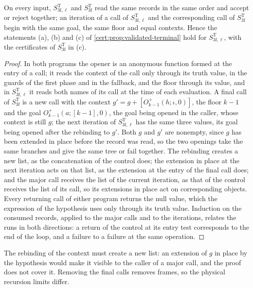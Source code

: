 \begin{proposition}\label{cert:prop:loop-continuation}
On every input, $S^{\mathrm T}_{3\mathrm f,\ell}$ and $S^{\mathrm T}_{3\mathrm f}$
read the same records in the same order and accept or reject together; an iteration
of a call of $S^{\mathrm T}_{3\mathrm f,\ell}$ and the corresponding call of
$S^{\mathrm T}_{3\mathrm f}$ begin with the same goal, the same floor and equal
contexts. Hence the statements (a), (b) and (c) of
\cref{cert:prop:validated-terminal} hold for $S^{\mathrm T}_{3\mathrm f,\ell}$, with
the certificates of $S^{\mathrm T}_{3\mathrm f}$ in (c).
\end{proposition}
\begin{proof}
In both programs the opener is an anonymous function formed at the entry of a call;
it reads the context of the call only through its truth value, in the guards of the
first phase and in the fallback, and the floor through its value, and in
$S^{\mathrm T}_{3\mathrm f,\ell}$ it reads both names of its call at the time of
each evaluation. A final call of $S^{\mathrm T}_{3\mathrm f}$ is a new call with the
context $g'=g+[O^{+}_{k-1}(h;\iota,0)]$, the floor $k-1$ and the goal
$O^{+}_{k-1}(a;[k-1],0)$, the goal being opened in the caller, whose context is still
$g$; the next iteration of $S^{\mathrm T}_{3\mathrm f,\ell}$ has the same three
values, its goal being opened after the rebinding to $g'$. Both $g$ and $g'$ are
nonempty, since $g$ has been extended in place before the record was read, so the
two openings take the same branches and give the same tree or fail together. The
rebinding creates a new list, as the concatenation of the control does; the
extension in place at the next iteration acts on that list, as the extension at the
entry of the final call does; and the major call receives the list of the current
iteration, as that of the control receives the list of its call, so its extensions
in place act on corresponding objects. Every returning call of either program
returns the null value, which the expression of the hypothesis uses only through its
truth value. Induction on the consumed records, applied to the major calls and to
the iterations, relates the runs in both directions: a return of the control at its
entry test corresponds to the end of the loop, and a failure to a failure at the
same operation.
\end{proof}

The rebinding of the context must create a new list: an extension of $g$ in place
by the hypothesis would make it visible to the caller of a major call, and the proof
does not cover it. Removing the final calls removes frames, so the physical
recursion limits differ.


